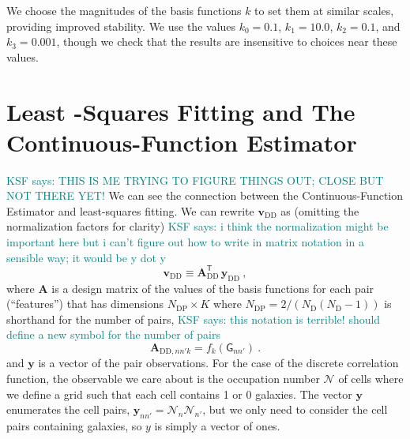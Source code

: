 \documentclass[modern]{aastex62}
\newcommand{\est}{the Continuous-Function Estimator\xspace}
\newcommand{\T}{^{\mathsf{T}}}
\newcommand{\bld}[1]{\bm{#1}}
\newcommand{\vv}[1]{\bld{v}_\mathrm{#1}}
\newcommand{\NN}[1]{N_\mathrm{#1}}
\newcommand{\GG}[1]{\mathsf{G}_{#1}}
\newcommand{\KSF}[1]{\textcolor{teal}{KSF says: #1}}
\begin{document}
We choose the magnitudes of the basis functions $k$ to set them at similar scales, providing improved stability.
We use the values $k_0=0.1$, $k_1=10.0$, $k_2=0.1$, and $k_3=0.001$, though we check that the results are insensitive to choices near these values.

\section{Least -Squares Fitting and The Continuous-Function Estimator}

\KSF{THIS IS ME TRYING TO FIGURE THINGS OUT; CLOSE BUT NOT THERE YET!}
We can see the connection between \est and least-squares fitting.
We can rewrite $\vv{DD}$ as (omitting the normalization factors for clarity)
\KSF{i think the normalization might be important here but i can't figure out how to write in matrix notation in a sensible way; it would be y dot y}
\begin{equation}
    \vv{DD}  \equiv \bld{A}_{\mathrm{DD}}\T\,\bld{y_\mathrm{DD}} ~,
\end{equation}
where $\bld{A}$ is a design matrix of the values of the basis functions for each pair (``features'') that has dimensions $\NN{DP} \times K$ where $\NN{DP} = 2/(\NN{D}(\NN{D}-1))$ is shorthand for the number of pairs,
\KSF{this notation is terrible! should define a new symbol for the number of pairs}
\begin{equation}
    \bld{A}_{\mathrm{DD},nn'k} = f_k(\GG{n n'}) ~.  
\end{equation}
and $\bld{y}$ is a vector of the pair observations.
For the case of the discrete correlation function, the observable we care about is the occupation number $\mathcal{N}$ of cells where we define a grid such that each cell contains 1 or 0 galaxies.
The vector $\bld{y}$ enumerates the cell pairs, $\bld{y}_{nn'} = \mathcal{N}_n\mathcal{N}_{n'}$, but we only need to consider the cell pairs containing galaxies, so $y$ is simply a vector of ones.
\end{document}
